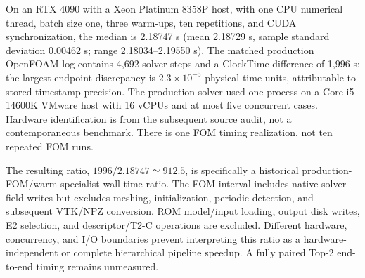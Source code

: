 On an RTX 4090 with a Xeon Platinum 8358P host, with one CPU numerical
thread, batch size one, three warm-ups, ten repetitions, and CUDA
synchronization, the median is 2.18747 s (mean 2.18729 s, sample standard
deviation 0.00462 s; range 2.18034--2.19550 s). The matched production
OpenFOAM log contains 4,692 solver steps and a ClockTime difference of
1,996 s; the largest endpoint discrepancy is $2.3\times10^{-5}$ physical
time units, attributable to stored timestamp precision. The production
solver used one process on a Core i5-14600K VMware host with 16 vCPUs and
at most five concurrent cases. Hardware identification is from the
subsequent source audit, not a contemporaneous benchmark. There is one
FOM timing realization, not ten repeated FOM runs.

The resulting ratio, $1996/2.18747\simeq912.5$, is specifically a historical
production-FOM/warm-specialist wall-time ratio. The FOM interval includes
native solver field writes but excludes meshing, initialization, periodic
detection, and subsequent VTK/NPZ conversion. ROM model/input loading,
output disk writes, E2 selection, and descriptor/T2-C operations are
excluded. Different hardware, concurrency, and I/O boundaries prevent
interpreting this ratio as a hardware-independent or complete hierarchical
pipeline speedup. A fully paired Top-2 end-to-end timing remains unmeasured.
